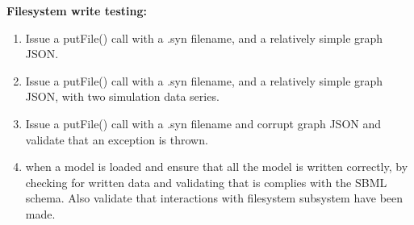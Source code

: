 \noindent \textbf{Filesystem write testing:}

\begin{enumerate}
\item Issue a putFile() call with a .syn filename, and a relatively simple graph JSON.
\item  Issue a putFile() call with a .syn filename, and a  relatively simple graph JSON, with two simulation data series.
\item  Issue a putFile() call with a .syn filename and corrupt graph JSON and validate that an exception is thrown. 
\item when a model is loaded and ensure that all the model is written correctly, by checking for written data and validating that is complies with the SBML schema. Also validate that interactions with filesystem subsystem have been made.
\end{enumerate}

